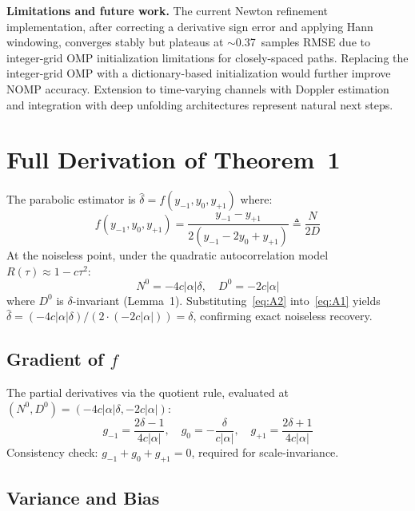 \documentclass[journal]{IEEEtran}
\begin{document}
\textbf{Limitations and future work.} The current Newton refinement implementation, after correcting a derivative sign error and applying Hann windowing, converges stably but plateaus at $\sim$0.37~samples RMSE due to integer-grid OMP initialization limitations for closely-spaced paths. Replacing the integer-grid OMP with a dictionary-based initialization would further improve NOMP accuracy. Extension to time-varying channels with Doppler estimation and integration with deep unfolding architectures represent natural next steps.

\appendices
\section{Full Derivation of Theorem~1}
\label{app:theorem1}

The parabolic estimator is $\hat{\delta} = f(y_{-1}, y_0, y_{+1})$ where:
\begin{equation}
f(y_{-1}, y_0, y_{+1}) = \frac{y_{-1} - y_{+1}}{2(y_{-1} - 2y_0 + y_{+1})} \triangleq \frac{N}{2D}
\label{eq:A1}
\end{equation}
At the noiseless point, under the quadratic autocorrelation model $R(\tau) \approx 1 - c\tau^2$:
\begin{equation}
N^0 = -4c|\alpha|\delta, \quad D^0 = -2c|\alpha|
\label{eq:A2}
\end{equation}
where $D^0$ is $\delta$-invariant (Lemma~1). Substituting~\eqref{eq:A2} into~\eqref{eq:A1} yields $\hat{\delta} = (-4c|\alpha|\delta) / (2 \cdot (-2c|\alpha|)) = \delta$, confirming exact noiseless recovery.

\subsection{Gradient of \texorpdfstring{$f$}{f}}

The partial derivatives via the quotient rule, evaluated at $(N^0, D^0) = (-4c|\alpha|\delta, -2c|\alpha|)$:
\begin{equation}
g_{-1} = \frac{2\delta - 1}{4c|\alpha|}, \quad
g_0    = -\frac{\delta}{c|\alpha|}, \quad
g_{+1} = \frac{2\delta + 1}{4c|\alpha|}
\label{eq:A4}
\end{equation}
Consistency check: $g_{-1} + g_0 + g_{+1} = 0$, required for scale-invariance.

\subsection{Variance and Bias}
\end{document}
